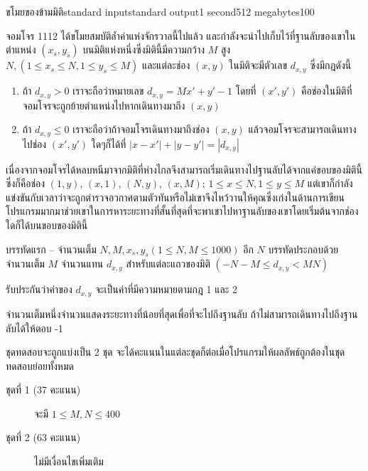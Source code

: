 \documentclass[11pt,a4paper]{article}
\begin{document}
\begin{problem}{ขโมยของข้ามมิติ}{standard input}{standard output}{1 second}{512 megabytes}{100}

จอมโจร 1112 ได้ขโมยสมบัติล้ำค่าแห่งจักรวาลนี้ไปแล้ว และกำลังจะนำไปเก็บไว้ที่ฐานลับของเขาในตำแหน่ง $(x_s,y_s)$ บนมิติแห่งหนึ่งซึ่งมิตินี้มีความกว้าง $M$ สูง $N, (1 \leq x_s \leq N,1 \leq y_s\leq M)$ และแต่ละช่อง $(x,y)$ ในมิติจะมีตัวเลข $d_{x,y}$ ซึ่งมีกฎดังนี้
\begin{enumerate}
\item 
ถ้า $d_{x,y}>0$ เราจะถือว่าหมายเลข $d_{x,y} = Mx' + y'-1$ โดยที่ $(x',y')$ คือช่องในมิติที่จอมโจรจะถูกย้ายตำแหน่งไปหากเดินทางมาถึง $(x,y)$

\item 	ถ้า $d_{x,y} \leq 0$ เราจะถือว่าถ้าจอมโจรเดินทางมาถึงช่อง $(x,y)$ แล้วจอมโจรจะสามารถเดินทางไปช่อง $(x',y')$ ใดๆก็ได้ที่ $|x-x' |+|y-y' |=|d_{x,y}|$

\end{enumerate}

เนื่องจากจอมโจรได้หลบหนีมาจากมิติที่ห่างไกลจึงสามารถเริ่มเดินทางไปฐานลับได้จากแค่ขอบของมิตินี้ ซึ่งก็คือช่อง $(1,y)$, $(x,1)$, 
$(N, y)$, $(x, M)$; $1 \leq x \leq N,1 \leq y \leq M$ แต่เขาก็กำลังแข่งขันกับเวลาว่าจะถูกตำรวจอวกาศตามตัวทันหรือไม่เขาจึงไหว้วานให้คุณซึ่งเก่งในด้านการเขียนโปรแกรมมากมาช่วยเขาในการหาระยะทางที่สั้นที่สุดที่จะพาเขาไปหาฐานลับของเขาโดยเริ่มต้นจากช่องใดก็ได้บนขอบของมิตินี้

\InputFile
บรรทัดแรก – จำนวนเต็ม $N,M,x_s,y_s (1 \leq N,M \leq 1000) $
อีก $N$ บรรทัดประกอบด้วยจำนวนเต็ม $M$ จำนวนแทน $d_{x,y}$ สำหรับแต่ละแถวของมิติ $(-N-M \leq d_{x,y} < MN)$

รับประกันว่าค่าของ $d_{x,y}$ จะเป็นค่าที่มีความหมายตามกฎ 1 และ 2

\OutputFile
จำนวนเต็มหนึ่งจำนวนแสดงระยะทางที่น้อยที่สุดเพื่อที่จะไปถึงฐานลับ ถ้าไม่สามารถเดินทางไปถึงฐานลับได้ให้ตอบ -1

\Scoring
ชุดทดสอบจะถูกแบ่งเป็น 2 ชุด จะได้คะแนนในแต่ละชุดก็ต่อเมื่อโปรแกรมให้ผลลัพธ์ถูกต้องในชุดทดสอบย่อยทั้งหมด

\begin{description}

\item[ชุดที่ 1 (37 คะแนน)] จะมี $ 1 \leq M, N \leq 400$

\item[ชุดที่ 2 (63 คะแนน)] ไม่มีเงื่อนไขเพิ่มเติม 

\end{description}


\end{problem}
\end{document}
